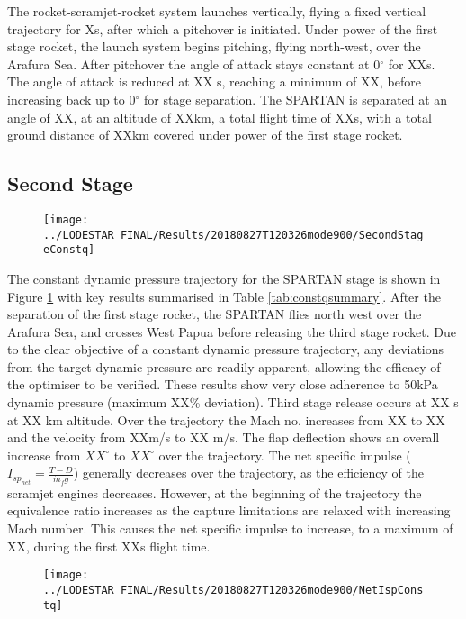 The rocket-scramjet-rocket system launches vertically, flying a fixed vertical trajectory for Xs, after which a pitchover is initiated. Under power of the first stage rocket, the launch system begins pitching, flying north-west, over the Arafura Sea. 
After pitchover the angle of attack stays constant at 0$^\circ$ for XXs. The angle of attack is reduced at XX s, reaching a minimum of XX, before increasing back up to 0$^\circ$ for stage separation. 
The SPARTAN is separated at an angle of XX, at an altitude of XXkm, a total flight time of XXs, with a total ground distance of XXkm covered under power of the first stage rocket. 



\subsection{Second Stage}

\begin{figure}[ht]
\centering
\texttt{[image: ../LODESTAR\_FINAL/Results/20180827T120326mode900/SecondStageConstq]}
\caption{}
\label{fig:SecondStageConstq}
\end{figure}


The constant dynamic pressure trajectory for the SPARTAN stage is shown in Figure \ref{fig:SecondStageConstq} with key results summarised in Table \ref{tab:constqsummary}. After the separation of the first stage rocket, the SPARTAN flies north west over the Arafura Sea, and crosses West Papua before releasing the third stage rocket. Due to the clear objective of a constant dynamic pressure trajectory, any deviations from the target dynamic pressure are readily apparent, allowing the efficacy of the optimiser to be verified. 
These results show very close adherence to 50kPa dynamic pressure (maximum XX\% deviation). Third stage release occurs at XX s at XX km altitude. 
Over the trajectory the Mach no. increases from XX to XX and the velocity from XXm/s to XX m/s. The flap deflection shows an overall increase from $XX^\circ$ to $XX^\circ$ over the trajectory.  The net specific impulse ($I_{sp_{net}} = \frac{T-D}{\dot{m}_f g}$) generally decreases over the trajectory, as the efficiency of the scramjet engines decreases. However, at the beginning of the trajectory the equivalence ratio increases as the capture limitations are relaxed with increasing Mach number. This causes the net specific impulse to increase, to a maximum of XX, during the first XXs flight time. 

\begin{figure}[ht]
	\centering
	\texttt{[image: ../LODESTAR\_FINAL/Results/20180827T120326mode900/NetIspConstq]}
	\caption{}
	\label{fig:NetIspConstq}
\end{figure}

